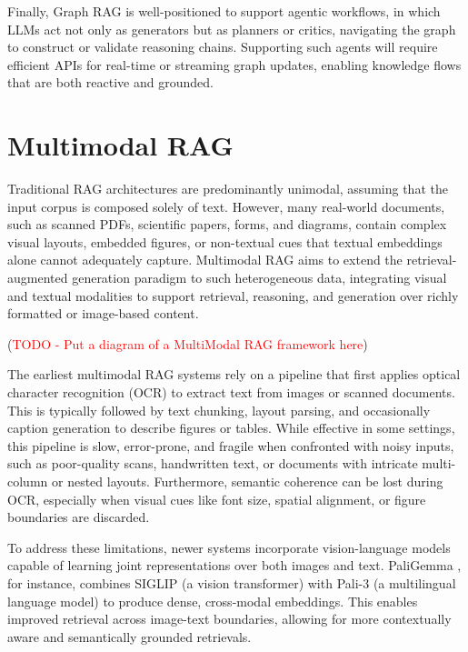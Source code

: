 \documentclass[12pt,twoside]{report}
\begin{document}
Finally, Graph RAG is well-positioned to support agentic workflows, in which LLMs act not only as generators but as planners or critics, navigating the graph to construct or validate reasoning chains. Supporting such agents will require efficient APIs for real-time or streaming graph updates, enabling knowledge flows that are both reactive and grounded.


\section{Multimodal RAG}

Traditional RAG architectures are predominantly unimodal, assuming that the input corpus is composed solely of text. However, many real-world documents, such as scanned PDFs, scientific papers, forms, and diagrams, contain complex visual layouts, embedded figures, or non-textual cues that textual embeddings alone cannot adequately capture. Multimodal RAG aims to extend the retrieval-augmented generation paradigm to such heterogeneous data, integrating visual and textual modalities to support retrieval, reasoning, and generation over richly formatted or image-based content.

(\textcolor{red}{TODO - Put a diagram of a MultiModal RAG framework here})

The earliest multimodal RAG systems rely on a pipeline that first applies optical character recognition (OCR) to extract text from images or scanned documents. This is typically followed by text chunking, layout parsing, and occasionally caption generation to describe figures or tables. While effective in some settings, this pipeline is slow, error-prone, and fragile when confronted with noisy inputs, such as poor-quality scans, handwritten text, or documents with intricate multi-column or nested layouts. Furthermore, semantic coherence can be lost during OCR, especially when visual cues like font size, spatial alignment, or figure boundaries are discarded.

To address these limitations, newer systems incorporate vision-language models capable of learning joint representations over both images and text. PaliGemma \cite{PaliGemma}, for instance, combines SIGLIP\cite{SIGLIP} (a vision transformer) with Pali-3\cite{Pali3} (a multilingual language model) to produce dense, cross-modal embeddings. This enables improved retrieval across image-text boundaries, allowing for more contextually aware and semantically grounded retrievals.
\end{document}
